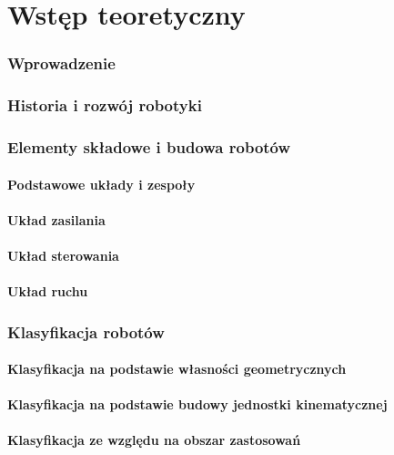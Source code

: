 \newpage
\part{Wstęp teoretyczny}
\section{Wprowadzenie}
\section{Historia i rozwój robotyki}
\section{Elementy składowe i budowa robotów}
\subsection{Podstawowe układy i zespoły}
\subsection{Układ zasilania}
\subsection{Układ sterowania}
\subsection{Układ ruchu}
\section{Klasyfikacja robotów}
\subsection{Klasyfikacja na podstawie własności geometrycznych}
\subsection{Klasyfikacja na podstawie budowy jednostki kinematycznej}
\subsection{Klasyfikacja ze względu na obszar zastosowań}